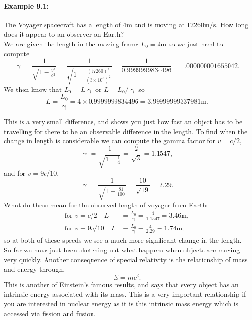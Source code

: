 \paragraph{Example 9.1:} The Voyager spacecraft has a length of $4\text{m}$ and is moving at $12 260\text{m/s}$. How long does it appear to an observer on Earth?\\

We are given the length in the moving frame $L_{0}=4\text{m}$ so we just need to compute 
\begin{equation*}
\upgamma=\frac{1}{\sqrt{1-\frac{v^{2}}{c^{2}}}}=\frac{1}{\sqrt{1-\frac{(17260)^{2}}{(3\times10^{8})^{2}}}}=\frac{1}{0.9999999834496}=1.000000001655042.
\end{equation*}
We then know that $L_{0}=L\upgamma$ or $L=L_{0}/\upgamma$ so
\begin{equation*}
L=\frac{L_{0}}{\upgamma}=4\times0.9999999834496=3.99999999337981\text{m}.
\end{equation*}

This is a very small difference, and shows you just how fast an object has to be travelling for there to be an observable difference in the length. To find when the change in length is considerable we can compute the gamma factor for $v=c/2$,
\begin{equation*}
\upgamma=\frac{1}{\sqrt{1-\frac{1}{4}}}=\frac{2}{\sqrt{3}}=1.1547,
\end{equation*}
and for $v=9c/10$,
\begin{equation*}
\upgamma=\frac{1}{\sqrt{1-\frac{81}{100}}}=\frac{10}{\sqrt{19}}=2.29.
\end{equation*}
What do these mean for the observed length of voyager from Earth:
\begin{align*}
\text{for } v=c/2 \quad L&=\frac{L_{0}}{\upgamma}=\frac{4}{1.1547}=3.46\text{m},\\
\text{for } v=9c/10 \quad L&=\frac{L_{0}}{\upgamma}=\frac{4}{2.29}=1.74\text{m},
\end{align*}
so at both of these speeds we see a much more significant change in the length.\\

So far we have just been sketching out what happens when objects are moving very quickly. Another consequence of special relativity is the relationship of mass and energy through,
\begin{equation}
E=mc^{2}.
\end{equation}
This is another of Einstein's famous results, and says that every object has an intrinsic energy associated with its mass. This is a very important relationship if you are interested in nuclear energy as it is this intrinsic mass energy which is accessed via fission and fusion. \\

